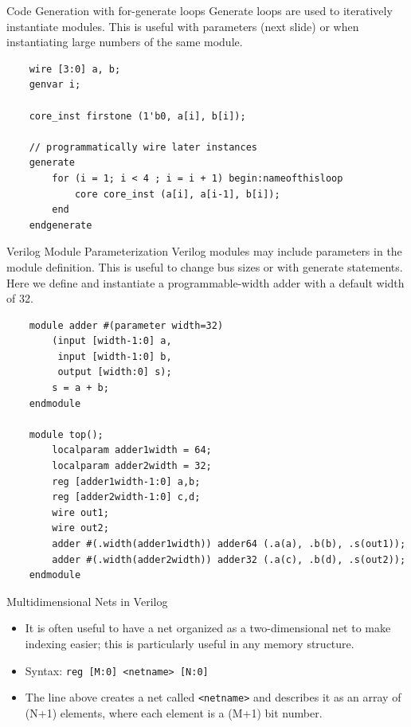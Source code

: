 \documentclass{beamer}
\begin{document}
\begin{frame}[fragile]{Code Generation with for-generate loops}
	Generate loops are used to iteratively instantiate modules.
	This is useful with parameters (next slide) or when instantiating large numbers of the same module.

	\begin{verbatim}
	wire [3:0] a, b;
	genvar i;

	core_inst firstone (1'b0, a[i], b[i]);

	// programmatically wire later instances
	generate
		for (i = 1; i < 4 ; i = i + 1) begin:nameofthisloop
			core core_inst (a[i], a[i-1], b[i]);
		end
	endgenerate
	\end{verbatim}

\end{frame}

\begin{frame}[fragile]{Verilog Module Parameterization}
	Verilog modules may include parameters in the module definition.
	This is useful to change bus sizes or with generate statements.
	Here we define and instantiate a programmable-width adder with a default width of 32.

	\begin{verbatim}
	module adder #(parameter width=32)
		(input [width-1:0] a,
		 input [width-1:0] b,
		 output [width:0] s);
		s = a + b;
	endmodule

	module top();
		localparam adder1width = 64;
		localparam adder2width = 32;
		reg [adder1width-1:0] a,b;
		reg [adder2width-1:0] c,d;
		wire out1;
		wire out2;
		adder #(.width(adder1width)) adder64 (.a(a), .b(b), .s(out1));
		adder #(.width(adder2width)) adder32 (.a(c), .b(d), .s(out2));
	endmodule
	\end{verbatim}

\end{frame}

\begin{frame}{Multidimensional Nets in Verilog}
	\begin{itemize}
		\item It is often useful to have a net organized as a two-dimensional net to make indexing easier; this is particularly useful in any memory structure.
		\item Syntax: \texttt{reg [M:0] <netname> [N:0]}
		\item The line above creates a net called \texttt{<netname>} and describes it as an array of (N+1) elements, where each element is a (M+1) bit number.
	\end{itemize}
\end{frame}
\end{document}

